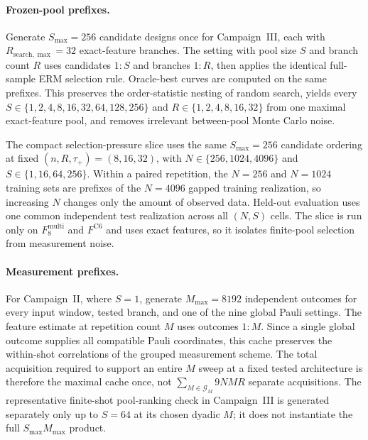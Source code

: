 \paragraph{Frozen-pool prefixes.}
Generate $S_{\max}=256$ candidate designs once for Campaign~III, each with
$R_{\mathrm{search},\max}=32$ exact-feature branches.  The setting with pool
size $S$ and branch count $R$ uses candidates $1{:}S$ and branches $1{:}R$,
then applies the identical full-sample ERM selection rule.  Oracle-best curves are computed
on the same prefixes.  This preserves the order-statistic nesting of random
search, yields every
$S\in\{1,2,4,8,16,32,64,128,256\}$ and
$R\in\{1,2,4,8,16,32\}$ from one maximal exact-feature pool, and removes
irrelevant between-pool Monte Carlo noise.

The compact selection-pressure slice uses the same $S_{\max}=256$ candidate
ordering at fixed $(n,R,\tau_+)=(8,16,32)$, with
$N\in\{256,1024,4096\}$ and $S\in\{1,16,64,256\}$.  Within a paired repetition,
the $N=256$ and $N=1024$ training sets are prefixes of the $N=4096$ gapped
training realization, so increasing $N$ changes only the amount of observed
data.  Held-out evaluation uses one common independent test realization across
all $(N,S)$ cells.  The slice is run only on
$F^{\mathrm{multi}}_8$ and $F^{\mathrm{C6}}$ and uses exact features, so it
isolates finite-pool selection from measurement noise.

\paragraph{Measurement prefixes.}
For Campaign~II, where $S=1$, generate $M_{\max}=8192$ independent outcomes
for every input window, tested branch, and one of the nine global Pauli
settings.  The feature estimate at repetition count $M$ uses outcomes $1{:}M$.
Since a single global outcome supplies all compatible Pauli coordinates, this
cache preserves the within-shot correlations of the grouped measurement
scheme.  The total acquisition required to support an entire $M$ sweep at a
fixed tested architecture is therefore the maximal cache once, not
$\sum_{M\in\mathcal G_M}9NMR$ separate acquisitions.  The representative
finite-shot pool-ranking check in Campaign~III is generated separately only up
to $S=64$ at its chosen dyadic $M$; it does not instantiate the full
$S_{\max}M_{\max}$ product.

